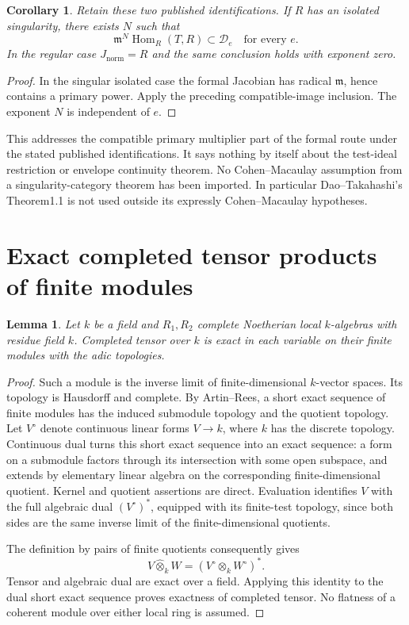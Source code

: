 \documentclass[11pt]{article}
\newtheorem{lemma}[theorem]{Lemma}
\newtheorem{corollary}[theorem]{Corollary}
\newcommand{\Hom}{\operatorname{Hom}}
\newcommand{\wtensor}{\mathbin{\widehat\otimes}}
\begin{document}
\begin{corollary}\label{primary}
Retain these two published identifications. If $R$ has an isolated
singularity, there exists $N$ such that
\[
 \mathfrak m^N\Hom_R(T,R)\subset\mathcal D_e
 \quad\text{for every }e.
\]
In the regular case $J_{\mathrm{norm}}=R$ and the same conclusion holds
with exponent zero.
\end{corollary}
\begin{proof}
In the singular isolated case the formal Jacobian has radical
$\mathfrak m$, hence contains a primary power. Apply the preceding
compatible-image inclusion. The exponent $N$ is independent of $e$.
\end{proof}
This addresses the compatible primary multiplier part of the formal
route under the stated published identifications. It says nothing by
itself about the test-ideal restriction or envelope continuity theorem.
No Cohen--Macaulay assumption from a singularity-category theorem has been
imported. In particular Dao--Takahashi's Theorem1.1 is not used outside
its expressly Cohen--Macaulay hypotheses.

\section{Exact completed tensor products of finite modules}
\begin{lemma}\label{exacttensor}
Let $k$ be a field and $R_1,R_2$ complete Noetherian local $k$-algebras
with residue field $k$. Completed tensor over $k$ is exact in each
variable on their finite modules with the adic topologies.
\end{lemma}
\begin{proof}
Such a module is the inverse limit of finite-dimensional $k$-vector
spaces. Its topology is Hausdorff and complete. By Artin--Rees, a short
exact sequence of finite modules has the induced submodule topology and
the quotient topology. Let $V^\circ$ denote continuous linear forms
$V\to k$, where $k$ has the discrete topology.
Continuous dual turns this short exact sequence into an exact sequence:
a form on a submodule factors through its intersection with some open
subspace, and extends by elementary linear algebra on the corresponding
finite-dimensional quotient. Kernel and quotient assertions are direct.
Evaluation identifies $V$ with the full algebraic dual
$(V^\circ)^*$, equipped with its finite-test topology, since both sides
are the same inverse limit of the finite-dimensional quotients.

The definition by pairs of finite quotients consequently gives
\[
 V\wtensor_k W=(V^\circ\otimes_k W^\circ)^*.
\]
Tensor and algebraic dual are exact over a field. Applying this identity
to the dual short exact sequence proves exactness of completed tensor.
No flatness of a coherent module over either local ring is assumed.
\end{proof}
\end{document}
